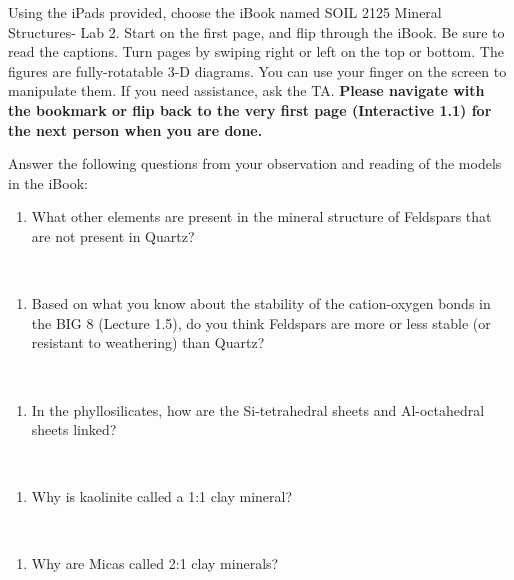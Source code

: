 \documentclass[
  letterpaper,
  twocolumn,
  portrait]{scrbook}
\providecommand{\tightlist}{%
  \setlength{\itemsep}{0pt}\setlength{\parskip}{0pt}}\usepackage{longtable,booktabs,array}
\begin{document}
Using the iPads provided, choose the iBook named SOIL 2125 Mineral
Structures- Lab 2. Start on the first page, and flip through the iBook.
Be sure to read the captions. Turn pages by swiping right or left on the
top or bottom. The figures are fully-rotatable 3-D diagrams. You can use
your finger on the screen to manipulate them. If you need assistance,
ask the TA. \textbf{Please navigate with the bookmark or flip back to
the very first page (Interactive 1.1) for the next person when you are
done.}

Answer the following questions from your observation and reading of the
models in the iBook:

\begin{enumerate}
\def\labelenumi{\arabic{enumi}.}
\tightlist
\item
  What other elements are present in the mineral structure of Feldspars
  that are not present in Quartz?
\end{enumerate}

~ ~ ~

\begin{enumerate}
\def\labelenumi{\arabic{enumi}.}
\setcounter{enumi}{1}
\tightlist
\item
  Based on what you know about the stability of the cation-oxygen bonds
  in the BIG 8 (Lecture 1.5), do you think Feldspars are more or less
  stable (or resistant to weathering) than Quartz?
\end{enumerate}

~ ~ ~

\begin{enumerate}
\def\labelenumi{\arabic{enumi}.}
\setcounter{enumi}{2}
\tightlist
\item
  In the phyllosilicates, how are the Si-tetrahedral sheets and
  Al-octahedral sheets linked?
\end{enumerate}

~ ~ ~

\begin{enumerate}
\def\labelenumi{\arabic{enumi}.}
\setcounter{enumi}{3}
\tightlist
\item
  Why is kaolinite called a 1:1 clay mineral?
\end{enumerate}

~ ~ ~

\begin{enumerate}
\def\labelenumi{\arabic{enumi}.}
\setcounter{enumi}{4}
\tightlist
\item
  Why are Micas called 2:1 clay minerals?
\end{enumerate}
\end{document}
